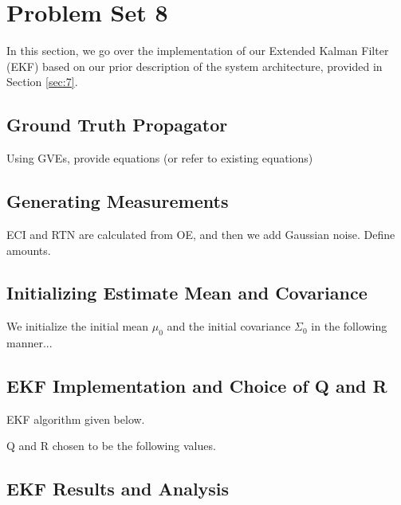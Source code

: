 \section{Problem Set 8}

In this section, we go over the implementation of our Extended Kalman Filter (EKF) based on our prior description of the system architecture, provided in Section \ref{sec:7}. 

\subsection{Ground Truth Propagator}

Using GVEs, provide equations (or refer to existing equations)

\subsection{Generating Measurements}

ECI and RTN are calculated from OE, and then we add Gaussian noise. Define amounts.

\subsection{Initializing Estimate Mean and Covariance}

We initialize the initial mean $\mu_0$ and the initial covariance $\Sigma_0$ in the following manner...

\subsection{EKF Implementation and Choice of Q and R}

EKF algorithm given below.

Q and R chosen to be the following values.

\subsection{EKF Results and Analysis}

